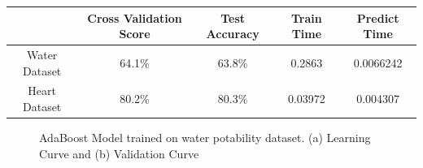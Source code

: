 \documentclass[
	letterpaper, %
]{mlreport}
\begin{document}
\begin{center}
	\begin{tabular}{|c||c|c|c|c|}
	 \hline
	  & Cross Validation Score & Test Accuracy & Train Time & Predict Time \\
	 \hline\hline
	 Water Dataset & 64.1\%  & 63.8\% & 0.2863 & 0.0066242 \\
	 \hline
	 Heart Dataset & 80.2\%  & 80.3\% & 0.03972 & 0.004307\\
	 \hline
	\end{tabular}
	\label{table:table2}
\end{center}
\begin{figure}
	\centering
	\caption{AdaBoost Model trained on water potability dataset. (a) Learning Curve and (b) Validation Curve}
	\label{fig:fig5}
\end{figure}
\end{document}
